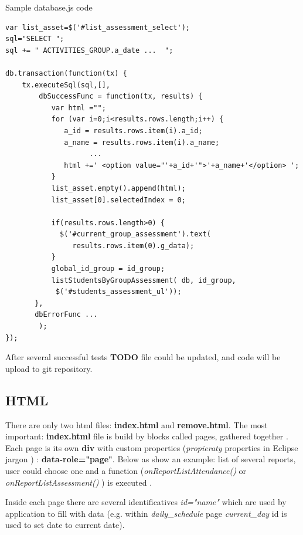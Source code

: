 \begin{bclogo}[couleur=blue!30,arrondi=0.1,ombre=true ] 
{Sample database.js code}    
\begin{verbatim}
var list_asset=$('#list_assessment_select'); 
sql="SELECT ";
sql += " ACTIVITIES_GROUP.a_date ...  ";

db.transaction(function(tx) {
    tx.executeSql(sql,[],
        dbSuccessFunc = function(tx, results) {
           var html ="";
           for (var i=0;i<results.rows.length;i++) {
              a_id = results.rows.item(i).a_id;
              a_name = results.rows.item(i).a_name;
                    ...
              html +=' <option value="'+a_id+'">'+a_name+'</option> ';
           }
           list_asset.empty().append(html);
           list_asset[0].selectedIndex = 0; 

           if(results.rows.length>0) {
             $('#current_group_assessment').text(
                results.rows.item(0).g_data); 
           }
           global_id_group = id_group;
           listStudentsByGroupAssessment( db, id_group, 
            $('#students_assessment_ul'));
       },
       dbErrorFunc ...
        ); 
});
\end{verbatim}    
\end{bclogo}    
    
    After several successful tests {\bf TODO} file could be updated, and  code will be upload to git repository.
  
    
	\subsection{HTML}
  There are only two html files: \textbf{index.html} and \textbf{remove.html}. The most important: \textbf{index.html} file is build by
   blocks called pages, gathered together \cite{JQueryMobilePage}. Each page is its own {\bf div } 
   with custom properties (\emph{propieraty} properties in Eclipse jargon ) : {\bf data-role="page"}. Below as show an example: list of several reports, user could choose one and a function (\emph{onReportListAttendance() } or \emph{onReportListAssessment() }  ) is executed .
   
   
  Inside each page there are several identificatives \emph{id="name"} which are used by application to fill with data (e.g.
   within \emph{daily\_schedule} page \emph{current\_day} id is used to set date to current date). 
  
